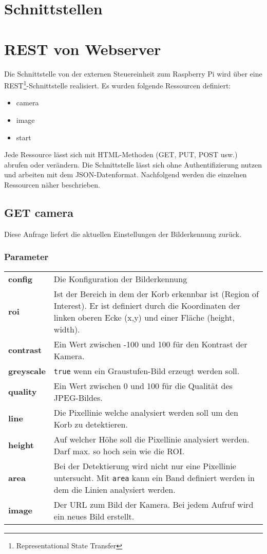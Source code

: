 \section{Schnittstellen}

\section{REST von Webserver}

Die Schnittstelle von der externen Steuereinheit zum Raspberry Pi wird über eine REST\footnote{Representational State Transfer}-Schnittstelle realisiert. Es wurden folgende Ressourcen definiert:
\begin{itemize}
	\item camera
	\item image
	\item start
\end{itemize}
Jede Ressource lässt sich mit HTML-Methoden (GET, PUT, POST usw.) abrufen oder verändern. Die Schnittstelle lässt sich ohne Authentifizierung nutzen und arbeiten mit dem JSON-Datenformat. Nachfolgend werden die einzelnen Ressourcen näher beschrieben.

\subsection{GET camera}

Diese Anfrage liefert die aktuellen Einstellungen der Bilderkennung zurück.

\subsubsection{Parameter}

\begin{tabular}{l p{16cm}}
	\textbf{config} & Die Konfiguration der Bilderkennung \\
	\textbf{roi} & Ist der Bereich in dem der Korb erkennbar ist (Region of Interest). Er ist definiert durch die Koordinaten der linken oberen Ecke (x,y) und einer Fläche (height, width). \\
	\textbf{contrast} & Ein Wert zwischen -100 und 100 für den Kontrast der Kamera. \\
	\textbf{greyscale} & \texttt{true} wenn ein Graustufen-Bild erzeugt werden soll. \\
	\textbf{quality} & Ein Wert zwischen 0 und 100 für die Qualität des JPEG-Bildes. \\
	\textbf{line} & Die Pixellinie welche analysiert werden soll um den Korb zu detektieren. \\
	\textbf{height} & Auf welcher Höhe soll die Pixellinie analysiert werden. Darf max. so hoch sein wie die ROI. \\
	\textbf{area} & Bei der Detektierung wird nicht nur eine Pixellinie untersucht. Mit \texttt{area} kann ein Band definiert werden in dem die Linien analysiert werden. \\
	\textbf{image} & Der URL zum Bild der Kamera. Bei jedem Aufruf wird ein neues Bild erstellt.
\end{tabular}

